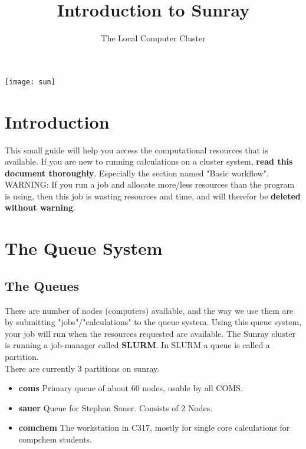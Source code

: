\documentclass{article}
\title{Introduction to Sunray}
\author{The Local Computer Cluster}
\date{}
\begin{document}

\maketitle

\begin{center}
    \texttt{[image: sun]}
\end{center}

\tableofcontents


\newpage


\section{Introduction}

This small guide will help you access the computational resources that is available.
If you are new to running calculations on a cluster system, {\bf read this document thoroughly}.
Especially the section named "Basic workflow".\\

WARNING: If you run a job and allocate more/less resources than the program is using, then this job is wasting resources and time, and will therefor be {\bf deleted without warning}.


\newpage
\section{The Queue System}

\subsection*{The Queues}

There are number of nodes (computers) available, and the way we use them are by submitting "jobs"/"calculations" to the queue system.
%
Using this queue system, your job will run when the resources requested are available.
The Sunray cluster is running a job-manager called {\bf SLURM}.
In SLURM a queue is called a partition.\\

There are currently 3 partitions on sunray.

\begin{itemize}
    \item {\bf coms} Primary queue of about 60 nodes, usable by all COMS. \newline

    \item {\bf sauer} Queue for Stephan Sauer. Consists of 2 Nodes. \newline

    \item {\bf comchem} The workstation in C317, mostly for single core calculations for compchem students.

\end{itemize}
\end{document}
